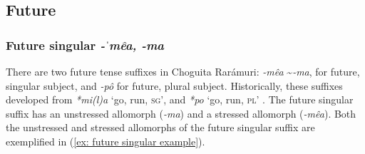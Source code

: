     \z
\z

\subsection{Future}
\label{subsec: future}

\subsubsection{Future singular \textit{-ˈmêa, -ma}}
\label{subsubsec: future singular}

There are two future tense suffixes in Choguita Rarámuri: \textit{-mêa} \textasciitilde \textit{-ma}, for future, singular subject, and \textit{-pô} for future, plural subject. Historically, these suffixes developed from  \textit{*mi(l)a} ‘go, run, \textsc{sg}’, and \textit{*po} ‘go, run, \textsc{pl}’ \citep[133]{miller1996guarijio}. The future
singular suffix has an unstressed allomorph (\textit{-ma}) and a stressed allomorph (\textit{-mêa}). Both the unstressed and stressed allomorphs of the future singular suffix are exemplified in (\ref{ex: future singular example}).

\ea\label{ex: future singular example}

